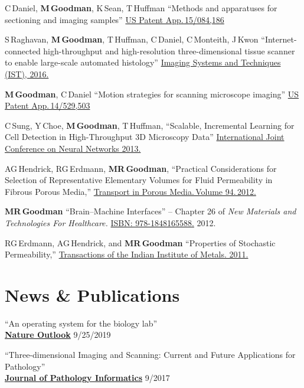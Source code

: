 \documentclass{res}
\begin{document}
\begin{resume}
  C\,Daniel, \textbf{M\,Goodman}, K\,Sean, T\,Huffman
  ``Methods and apparatuses for sectioning and imaging samples''
  \href{https://patents.google.com/patent/US20160290895A1/en}{US Patent App.\,15/084,186}

  S\,Raghavan, \textbf{M\,Goodman}, T\,Huffman, C\,Daniel, C\,Monteith, J\,Kwon
  ``Internet-connected high-throughput and high-resolution three-dimensional tissue scanner to
  enable large-scale automated histology''
  \href{https://doi.org/10.1109/IST.2016.7738254}{Imaging Systems and Techniques (IST), 2016.}

  \textbf{M\,Goodman}, C\,Daniel
  ``Motion strategies for scanning microscope imaging''
  \href{https://patents.google.com/patent/US20150138532A1/en}{US Patent App.\,14/529,503}

  C\,Sung, Y\,Choe, \textbf{M\,Goodman}, T\,Huffman,
  ``Scalable, Incremental Learning for Cell Detection in High-Throughput 3D Microscopy Data''
  \href{https://doi.org/10.1109/IJCNN.2013.6706769}{International Joint Conference on Neural Networks 2013.}

  AG\,Hendrick, RG\,Erdmann, \textbf{MR\,Goodman},
  ``Practical Considerations for Selection of Representative
  Elementary Volumes for Fluid Permeability in Fibrous Porous Media,''
  \href{http://dx.doi.org/10.1007/s11242-012-0051-8}{Transport in Porous Media.\,Volume 94.\,2012.}

  \textbf{MR\,Goodman}
  ``Brain--Machine Interfaces'' -- Chapter 26 of \textit{New Materials and Technologies For Healthcare.}
  \href{http://amzn.com/1848165587}{ISBN: 978-1848165588.} 2012.

  RG\,Erdmann, AG\,Hendrick, and \textbf{MR\,Goodman}
  ``Properties of Stochastic Permeability,''
  \href{http://dx.doi.org/10.1007/s12666-009-0038-5}{Transactions of the Indian Institute of Metals. 2011.}

\section{News \& Publications}
  ``An operating system for the biology lab'' \\
  \href{https://www.nature.com/articles/d41586-019-02875-z}{\textbf{Nature Outlook}} \hfill 9/25/2019

  ``Three-dimensional Imaging and Scanning: Current and Future Applications for Pathology'' \\
  \href{https://www.ncbi.nlm.nih.gov/pmc/articles/PMC5609355/}{\textbf{Journal of Pathology Informatics}} \hfill 9/2017
  

\end{resume}
\end{document}
